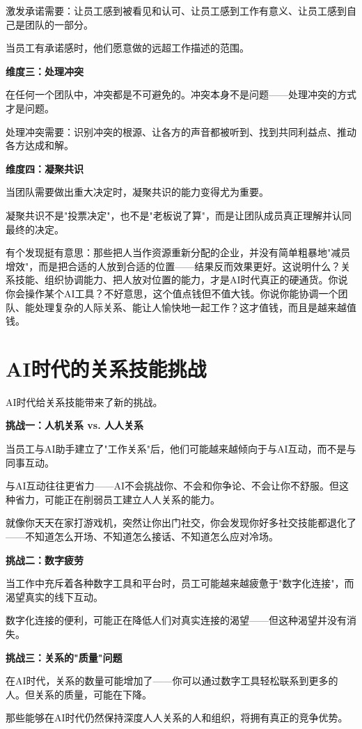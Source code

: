 激发承诺需要：让员工感到被看见和认可、让员工感到工作有意义、让员工感到自己是团队的一部分。

当员工有承诺感时，他们愿意做的远超工作描述的范围。

\textbf{维度三：处理冲突}

在任何一个团队中，冲突都是不可避免的。冲突本身不是问题——处理冲突的方式才是问题。

处理冲突需要：识别冲突的根源、让各方的声音都被听到、找到共同利益点、推动各方达成和解。

\textbf{维度四：凝聚共识}

当团队需要做出重大决定时，凝聚共识的能力变得尤为重要。

凝聚共识不是"投票决定"，也不是"老板说了算"，而是让团队成员真正理解并认同最终的决定。

有个发现挺有意思：那些把人当作资源重新分配的企业，并没有简单粗暴地"减员增效"，而是把合适的人放到合适的位置——结果反而效果更好。这说明什么？关系技能、组织协调能力、把人放对位置的能力，才是AI时代真正的硬通货。你说你会操作某个AI工具？不好意思，这个值点钱但不值大钱。你说你能协调一个团队、能处理复杂的人际关系、能让人愉快地一起工作？这才值钱，而且是越来越值钱。

\section{AI时代的关系技能挑战}


AI时代给关系技能带来了新的挑战。

\textbf{挑战一：人机关系 vs. 人人关系}

当员工与AI助手建立了"工作关系"后，他们可能越来越倾向于与AI互动，而不是与同事互动。

与AI互动往往更省力——AI不会挑战你、不会和你争论、不会让你不舒服。但这种省力，可能正在削弱员工建立人人关系的能力。

就像你天天在家打游戏机，突然让你出门社交，你会发现你好多社交技能都退化了——不知道怎么开场、不知道怎么接话、不知道怎么应对冷场。

\textbf{挑战二：数字疲劳}

当工作中充斥着各种数字工具和平台时，员工可能越来越疲惫于"数字化连接"，而渴望真实的线下互动。

数字化连接的便利，可能正在降低人们对真实连接的渴望——但这种渴望并没有消失。

\textbf{挑战三：关系的"质量"问题}

在AI时代，关系的数量可能增加了——你可以通过数字工具轻松联系到更多的人。但关系的质量，可能在下降。

那些能够在AI时代仍然保持深度人人关系的人和组织，将拥有真正的竞争优势。

